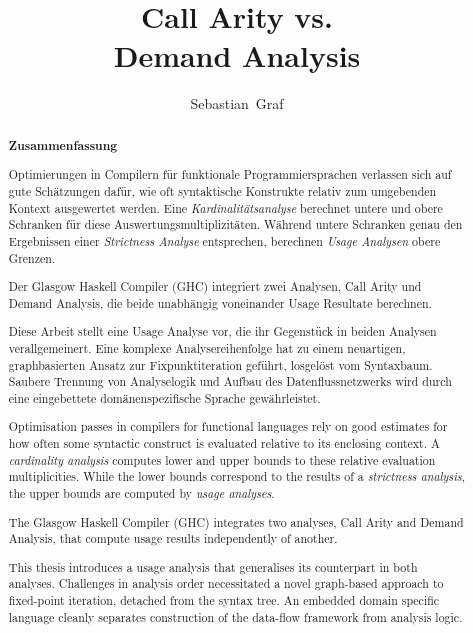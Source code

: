 \documentclass[12pt,a4paper,twoside,headings=openright]{scrreprt}
\title{Call Arity vs.\\Demand Analysis}
\author{Sebastian~Graf}
\begin{document}
\begin{otherlanguage}{ngerman} %
\mytitlepage
\end{otherlanguage}

\begin{abstract}
\begin{center}\Huge\textbf{\textsf{Zusammenfassung}}
\end{center}
\vfill

  Optimierungen in Compilern für funktionale Programmiersprachen verlassen sich auf gute Schätzungen dafür, wie oft syntaktische Konstrukte relativ zum umgebenden Kontext ausgewertet werden.
  Eine \emph{Kardinalitätsanalyse} berechnet untere und obere Schranken für diese Auswertungsmultiplizitäten.
  Während untere Schranken genau den Ergebnissen einer \emph{Strictness Analyse} entsprechen, berechnen \emph{Usage Analysen} obere Grenzen.

  Der Glasgow Haskell Compiler (GHC) integriert zwei Analysen, Call Arity und Demand Analysis, die beide unabhängig voneinander Usage Resultate berechnen.

  Diese Arbeit stellt eine Usage Analyse vor, die ihr Gegenstück in beiden Analysen verallgemeinert.
  Eine komplexe Analysereihenfolge hat zu einem neuartigen, graphbasierten Ansatz zur Fixpunktiteration geführt, losgelöst vom Syntaxbaum.
  Saubere Trennung von Analyselogik und Aufbau des Datenflussnetzwerks wird durch eine eingebettete domänenspezifische Sprache gewährleistet.
  
\vfill

  Optimisation passes in compilers for functional languages rely on good estimates for how often some syntactic construct is evaluated relative to its enclosing context.
  A \emph{cardinality analysis} computes lower and upper bounds to these relative evaluation multiplicities.
  While the lower bounds correspond to the results of a \emph{strictness analysis}, the upper bounds are computed by \emph{usage analyses}.

  The Glasgow Haskell Compiler (GHC) integrates two analyses, Call Arity and Demand Analysis, that compute usage results independently of another.

  This thesis introduces a usage analysis that generalises its counterpart in both analyses.
  Challenges in analysis order necessitated a novel graph-based approach to fixed-point iteration, detached from the syntax tree.
  An embedded domain specific language cleanly separates construction of the data-flow framework from analysis logic.

\vfill

\end{abstract}
\end{document}
